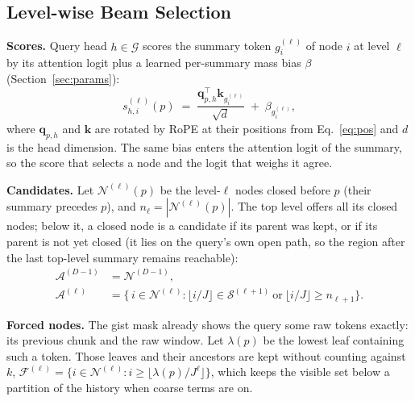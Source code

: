 \documentclass[10pt,twocolumn]{article}
\newcommand{\para}[1]{\noindent\textbf{#1}\hspace{0.5em}}
\begin{document}
\subsection{Level-wise Beam Selection}
\label{sec:select}

\para{Scores.}
Query head $h\in\mathcal{G}$ scores the summary token $g^{(\ell)}_i$ of node $i$ at level
$\ell$ by its attention logit plus a learned per-summary mass bias $\beta$
(Section~\ref{sec:params}):
\begin{equation}
  s^{(\ell)}_{h,i}(p) \;=\; \frac{\mathbf{q}_{p,h}^{\top}\mathbf{k}_{g^{(\ell)}_i}}{\sqrt{d}}
  \;+\; \beta_{g^{(\ell)}_i},
  \label{eq:score}
\end{equation}
where $\mathbf{q}_{p,h}$ and $\mathbf{k}$ are rotated by RoPE at their positions from
Eq.~\eqref{eq:pos} and $d$ is the head dimension. The same bias enters the attention logit
of the summary, so the score that selects a node and the logit that weighs it agree.

\para{Candidates.}
Let $\mathcal{N}^{(\ell)}(p)$ be the level-$\ell$ nodes closed before $p$ (their summary
precedes $p$), and $n_\ell=|\mathcal{N}^{(\ell)}(p)|$. The top level offers all its closed
nodes; below it, a closed node is a candidate if its parent was kept, or if its parent is not
yet closed (it lies on the query's own open path, so the region after the last top-level
summary remains reachable):
\begin{equation}
\begin{aligned}
  \mathcal{A}^{(D-1)} &= \mathcal{N}^{(D-1)},\\
  \mathcal{A}^{(\ell)} &= \bigl\{\, i\in\mathcal{N}^{(\ell)} :
     \lfloor i/J \rfloor \in \mathcal{S}^{(\ell+1)} \ \text{or}\
     \lfloor i/J \rfloor \ge n_{\ell+1} \bigr\}.
\end{aligned}
\label{eq:cand}
\end{equation}

\para{Forced nodes.}
The gist mask already shows the query some raw tokens exactly: its previous chunk and the
raw window. Let $\lambda(p)$ be the lowest leaf containing such a token. Those leaves and
their ancestors are kept without counting against $k$,
$\mathcal{F}^{(\ell)}=\{i\in\mathcal{N}^{(\ell)}: i\ge\lfloor\lambda(p)/J^{\ell}\rfloor\}$,
which keeps the visible set below a partition of the history when coarse terms are on.
\end{document}
